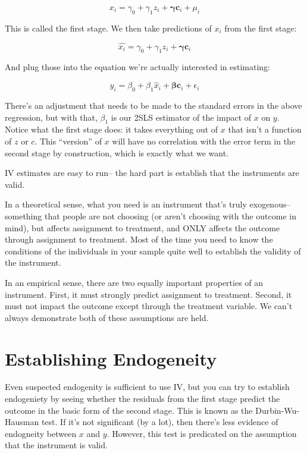 \documentclass[12 pt]{article}
\newcommand{\boldbeta}{\boldsymbol{\beta}}
\newcommand{\boldgamma}{\boldsymbol{\gamma}}
\begin{document}
\begin{equation}
  \label{eq:1}
  x_i=\gamma_0+\gamma_1z_i+ \boldgamma \boldsymbol{c}_i + \mu_i
\end{equation}

This is called the first stage. We then take predictions of $x_i$ from
the first stage:

\begin{equation}
  \label{eq:1}
  \hat{x_i}=\gamma_0+\gamma_1z_i+ \boldgamma \boldsymbol{c}_i 
\end{equation}

And plug those into the equation we're actually interested in
estimating:

\begin{equation}
  \label{eq:2}
  y_i=\beta_0+\beta_1\hat{x}_i+\boldbeta \boldsymbol{c}_i+ \epsilon_i
\end{equation}

There's an adjustment that needs to be made to the standard errors in
the above regression, but with that, $\beta_1$ is our 2SLS estimator
of the impact of $x$ on $y$. Notice what the first stage does: it
takes everything out of $x$ that isn't a function of $z$ or $c$. This
``version'' of $x$ will have no correlation with the error term in the
second stage by construction, which is exactly what we want. 

IV estimates are easy to run-- the hard part is establish that the
instruments are valid. 

In a theoretical sense, what you need is an instrument that's truly
exogenous-- something that people are not choosing (or aren't choosing
with the outcome in mind), but affects assignment to treatment, and
ONLY affects the outcome through assignment to treatment. Most of the
time you need to know the conditions of the individuals in your sample
quite well to establish the validity of the instrument. 

In an empirical sense, there are two equally important properties of an
instrument. First, it must strongly predict assignment to
treatment. Second, it must not impact the outcome except through the
treatment variable. We can't always demonstrate both of these
assumptions are held.


\section{Establishing Endogeneity}
\label{sec:establ-endog}

Even suspected endogenity is sufficient to use IV, but you can try to
establish endogeniety by seeing whether the residuals from the first
stage predict the outcome in the basic form of the second stage. This
is known as the Durbin-Wu-Hausman test. If it's not significant (by a
lot), then there's less evidence of endogneity between $x$ and
$y$. However, this test is predicated on the assumption that the
instrument is valid.  
\end{document}
